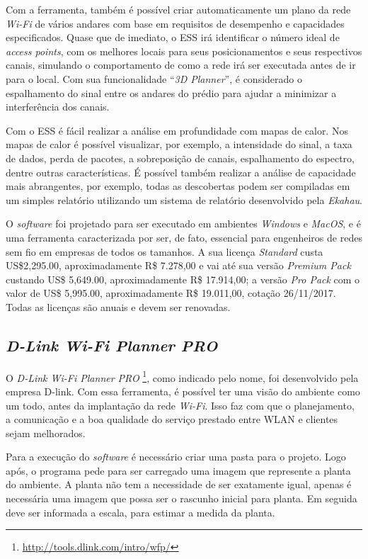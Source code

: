 \documentclass[
	12pt,				%
	twoside,			%
	a4paper,			%
	english,			%
	french,				%
	spanish,			%
	brazil				%
	]{abntex2}
\begin{document}
Com a ferramenta, também é possível criar automaticamente um plano da
rede \emph{Wi-Fi} de vários andares com base em requisitos de desempenho
e capacidades especificados. Quase que de imediato, o ESS irá
identificar o número ideal de \emph{access points}, com os melhores
locais para seus posicionamentos e seus respectivos canais, simulando o
comportamento de como a rede irá ser executada antes de ir para o local.
Com sua funcionalidade ``\emph{3D Planner}'', é considerado o
espalhamento do sinal entre os andares do prédio para ajudar a minimizar
a interferência dos canais.

Com o ESS é fácil realizar a análise em profundidade com mapas de calor.
Nos mapas de calor é possível visualizar, por exemplo, a intensidade do
sinal, a taxa de dados, perda de pacotes, a sobreposição de canais,
espalhamento do espectro, dentre outras características. É possível
também realizar a análise de capacidade mais abrangentes, por exemplo,
todas as descobertas podem ser compiladas em um simples relatório
utilizando um sistema de relatório desenvolvido pela \emph{Ekahau}.

O \emph{software} foi projetado para ser executado em ambientes
\emph{Windows} e \emph{MacOS}, e é uma ferramenta caracterizada por ser,
de fato, essencial para engenheiros de redes sem fio em empresas de
todos os tamanhos. A sua licença \emph{Standard} custa US\$2,295.00,
aproximadamente R\$ 7.278,00 e vai até sua versão \emph{Premium Pack}
custando US\$ 5,649.00, aproximadamente R\$ 17.914,00; a versão
\emph{Pro Pack} com o valor de US\$ 5,995.00, aproximadamente R\$
19.011,00, cotação 26/11/2017. Todas as licenças são anuais e devem ser
renovadas.

\subsection{\texorpdfstring{\emph{D-Link Wi-Fi Planner
PRO}}{D-Link Wi-Fi Planner PRO}}\label{d-link-wi-fi-planner-pro}

O \emph{D-Link Wi-Fi Planner PRO} \footnote{\url{http://tools.dlink.com/intro/wfp/}},
como indicado pelo nome, foi desenvolvido pela empresa D-link. Com essa
ferramenta, é possível ter uma visão do ambiente como um todo, antes da
implantação da rede \emph{Wi-Fi}. Isso faz com que o planejamento, a
comunicação e a boa qualidade do serviço prestado entre WLAN e clientes
sejam melhorados.

Para a execução do \emph{software} é necessário criar uma pasta para o
projeto. Logo após, o programa pede para ser carregado uma imagem que
represente a planta do ambiente. A planta não tem a necessidade de ser
exatamente igual, apenas é necessária uma imagem que possa ser o
rascunho inicial para planta. Em seguida deve ser informada a escala,
para estimar a medida da planta.
\end{document}
